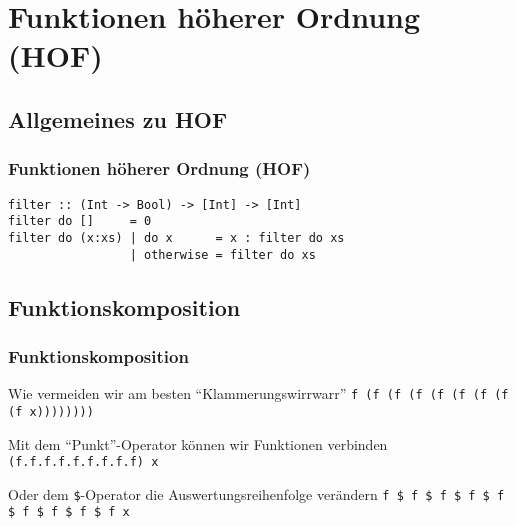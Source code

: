 \section{Funktionen höherer Ordnung (HOF)}
\subsection{Allgemeines zu HOF}

\begin{frame}[fragile]
\frametitle{Funktionen höherer Ordnung (HOF)}
\begin{lstlisting}
filter :: (Int -> Bool) -> [Int] -> [Int]
filter do []     = 0
filter do (x:xs) | do x      = x : filter do xs
                 | otherwise = filter do xs
\end{lstlisting}
\end{frame}

\subsection{Funktionskomposition}
\begin{frame}[fragile]
\frametitle{Funktionskomposition}
\begin{block}{Wie vermeiden wir am besten "`Klammerungswirrwarr"'}
\lstinline|f (f (f (f (f (f (f (f (f x))))))))|
\end{block}
\pause
\begin{block}{Mit dem "`Punkt"'-Operator können wir Funktionen verbinden}
\lstinline|(f.f.f.f.f.f.f.f.f) x|
\end{block}
\pause
\begin{block}{Oder dem \lstinline|$|-Operator die Auswertungsreihenfolge verändern}
\lstinline|f $ f $ f $ f $ f $ f $ f $ f $ f x|
\end{block}
\end{frame}

